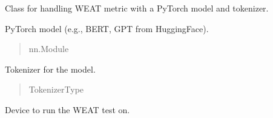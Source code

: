 \documentclass[letterpaper,10pt,english]{sphinxmanual}
\begin{document}
\begin{fulllineitems}

\pysigstartsignatures
\pysiglinewithargsret
{}
{\sphinxparamcomma {}\sphinxparamcomma {}}
{}
\pysigstopsignatures
\sphinxAtStartPar
Class for handling WEAT metric with a PyTorch model and tokenizer.


\begin{fulllineitems}

\pysigstartsignatures
\pysigline
{}
\pysigstopsignatures
\sphinxAtStartPar
PyTorch model (e.g., BERT, GPT from HuggingFace).
\begin{quote}\begin{description}
\sphinxAtStartPar
nn.Module

\end{description}\end{quote}

\end{fulllineitems}



\begin{fulllineitems}

\pysigstartsignatures
\pysigline
{}
\pysigstopsignatures
\sphinxAtStartPar
Tokenizer for the model.
\begin{quote}\begin{description}
\sphinxAtStartPar
TokenizerType

\end{description}\end{quote}

\end{fulllineitems}



\begin{fulllineitems}

\pysigstartsignatures
\pysigline
{}
\pysigstopsignatures
\sphinxAtStartPar
Device to run the WEAT test on.
\begin{quote}\begin{description}
\sphinxAtStartPar
{}


\end{description}
\end{quote}
\end{fulllineitems}
\end{fulllineitems}
\end{document}
